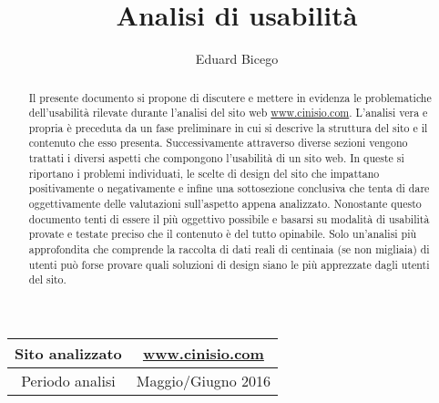 \documentclass[a4paper,11pt]{article}
\begin{document}
\title{Analisi di usabilità}
\author{Eduard Bicego}

\maketitle

%


\begin{table} [h]
		\centering
		\begin{tabular}{c|c}
			Sito analizzato & \href{http://www.cinisio.com/}{www.cinisio.com} \\
			\midrule
			Periodo analisi & Maggio/Giugno 2016 \\
		\end{tabular}
	
\end{table}


\begin{abstract}

	Il presente documento si propone di discutere e mettere in evidenza le problematiche dell'usabilità rilevate durante l'analisi del sito web \href{http://www.cinisio.com/}{www.cinisio.com}. L'analisi vera e propria è preceduta da un fase preliminare in cui si descrive la struttura del sito e il contenuto che esso presenta. Successivamente attraverso diverse sezioni vengono trattati i diversi aspetti che compongono l'usabilità di un sito web. In queste si riportano i problemi individuati, le scelte di design del sito che impattano positivamente o negativamente e infine una sottosezione conclusiva che tenta di dare oggettivamente delle valutazioni sull'aspetto appena analizzato. 
	Nonostante questo documento tenti di essere il più oggettivo possibile e basarsi su modalità di usabilità provate e testate preciso che il contenuto è del tutto opinabile. Solo un'analisi più approfondita che comprende la raccolta di dati reali di centinaia (se non migliaia) di utenti può forse provare quali soluzioni di design siano le più apprezzate dagli utenti del sito.

\end{abstract}
	


\newpage
	\tableofcontents
	\listoffigures

\hypersetup{linkcolor=blue, urlcolor=blue}














\end{document}
